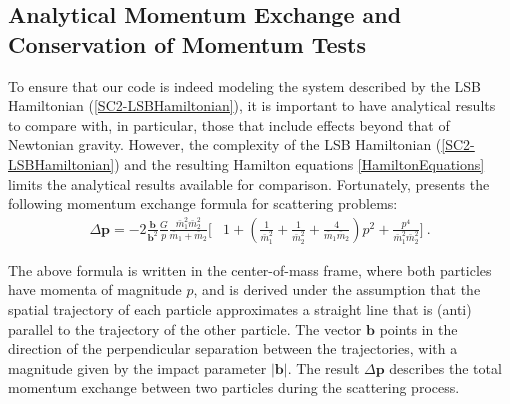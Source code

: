 \documentclass[aps,onecolumn,notitlepage,eqsecnum,nofootinbib,floatfix,superscriptaddress]{revtex4-1}
\begin{document}
%
%
\subsection{Analytical Momentum Exchange and Conservation of Momentum Tests}
\label{sec_analytical}

To ensure that our code is indeed modeling the system described by the LSB Hamiltonian (\ref{SC2-LSBHamiltonian}), it is important to have analytical results to compare with, in particular, those that include effects beyond that of Newtonian gravity. However, the complexity of the LSB Hamiltonian (\ref{SC2-LSBHamiltonian}) and the resulting Hamilton equations \ref{HamiltonEquations} limits the analytical results available for comparison. Fortunately, \cite{PM} presents the following momentum exchange formula for scattering problems:
\begin{equation}
\begin{aligned} \label{delta_p}
\Delta \textbf{p} = -2\frac{{\textbf{b}}}{{\textbf{b}}^2} \frac{G}{p}
\frac{\bar{m}_1^2 \bar{m}_2^2}{\bar{m}_1 + \bar{m}_2 }
\biggl[&
1+\left(\frac{1}{\bar{m}_1^2}+\frac{1}{\bar{m}_2^2}+\frac{4}{\bar{m}_1 \bar{m}_2} \right){p}^2 + \frac{{p}^4}{\bar{m}_1^2 \bar{m}_2^2 }
\biggr]~.
\end{aligned}
\end{equation}

\noindent The above formula is written in the center-of-mass frame, where both particles have momenta of magnitude $p$, and is derived under the assumption that the spatial trajectory of each particle approximates a straight line that is (anti) parallel to the trajectory of the other particle. The vector $\textbf{b}$ points in the direction of the perpendicular separation between the trajectories, with a magnitude given by the impact parameter $|\textbf{b}|$. The result $\Delta \textbf{p}$ describes the total momentum exchange between two particles during the scattering process.
\end{document}
